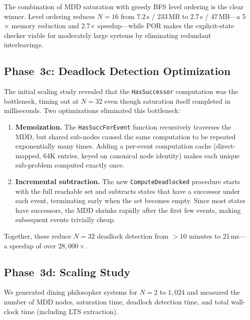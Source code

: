 \documentclass[11pt]{article}
\begin{document}
The combination of MDD saturation with greedy BFS level ordering is
the clear winner.  Level ordering reduces $N = 16$ from 7.2\,s / 233\,MB
to 2.7\,s / 47\,MB---a 5$\times$ memory reduction and 2.7$\times$
speedup---while POR makes the explicit-state checker viable for
moderately large systems by eliminating redundant interleavings.

\subsection{Phase~3c: Deadlock Detection Optimization}

The initial scaling study revealed that the \texttt{HasSuccessor}
computation was the bottleneck, timing out at $N = 32$ even though
saturation itself completed in milliseconds.  Two optimizations
eliminated this bottleneck:

\begin{enumerate}
\item \textbf{Memoization.}  The \texttt{HasSuccForEvent} function
  recursively traverses the MDD, but shared sub-nodes caused the same
  computation to be repeated exponentially many times.  Adding a
  per-event computation cache (direct-mapped, 64K entries, keyed on
  canonical node identity) makes each unique sub-problem computed exactly
  once.

\item \textbf{Incremental subtraction.}  The new \texttt{ComputeDeadlocked}
  procedure starts with the full reachable set and subtracts states that
  have a successor under each event, terminating early when the set
  becomes empty.  Since most states have successors, the MDD shrinks
  rapidly after the first few events, making subsequent events trivially
  cheap.
\end{enumerate}

Together, these reduce $N = 32$ deadlock detection from $> 10$ minutes
to 21\,ms---a speedup of over $28{,}000\times$.

\subsection{Phase~3d: Scaling Study}

We generated dining philosopher systems for $N = 2$ to $1{,}024$ and
measured the number of MDD nodes, saturation time, deadlock detection
time, and total wall-clock time (including LTS extraction).
\end{document}
